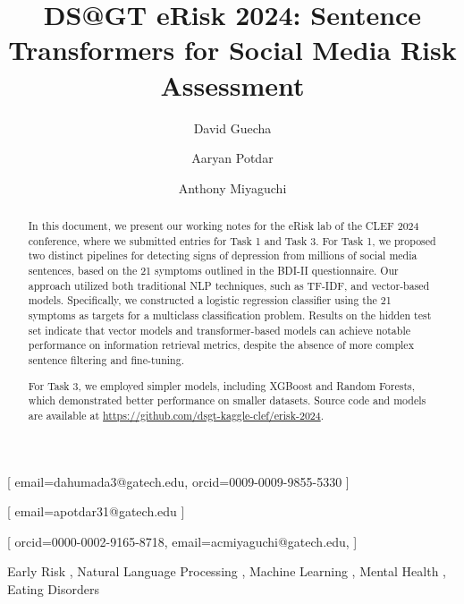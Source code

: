 \documentclass[]{style/ceurart}
\begin{document}


\title{
DS@GT eRisk 2024: Sentence Transformers for Social Media Risk Assessment
}

\author[1]{David Guecha}[
email=dahumada3@gatech.edu,
orcid=0009-0009-9855-5330
]
\cormark[1]
\author[1]{Aaryan Potdar}[
email=apotdar31@gatech.edu
]
\author[1]{Anthony Miyaguchi}[
orcid=0000-0002-9165-8718,
email=acmiyaguchi@gatech.edu,
]


\address[1]{Georgia Institute of Technology, North Ave NW, Atlanta, GA 30332}


\begin{abstract}
In this document, we present our working notes for the eRisk lab of the CLEF 2024 conference, where we submitted entries for Task 1 and Task 3. For Task 1, we proposed two distinct pipelines for detecting signs of depression from millions of social media sentences, based on the 21 symptoms outlined in the BDI-II questionnaire. Our approach utilized both traditional NLP techniques, such as TF-IDF, and vector-based models. Specifically, we constructed a logistic regression classifier using the 21 symptoms as targets for a multiclass classification problem. Results on the hidden test set indicate that vector models and transformer-based models can achieve notable performance on information retrieval metrics, despite the absence of more complex sentence filtering and fine-tuning.

For Task 3, we employed simpler models, including XGBoost and Random Forests, which demonstrated better performance on smaller datasets. Source code and models are available at \href{https://github.com/dsgt-kaggle-clef/erisk-2024}{https://github.com/dsgt-kaggle-clef/erisk-2024}.

\end{abstract}

\begin{keywords}
  Early Risk \sep
  Natural Language Processing \sep
  Machine Learning \sep
  Mental Health \sep
  Eating Disorders
\end{keywords}


\maketitle
\end{document}
